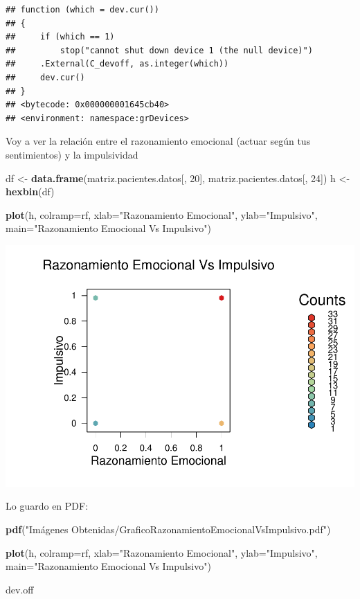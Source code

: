 \documentclass[]{article}
\newenvironment{Shaded}{\begin{snugshade}}{\end{snugshade}}
\newcommand{\DataTypeTok}[1]{\textcolor[rgb]{0.13,0.29,0.53}{#1}}
\newcommand{\DecValTok}[1]{\textcolor[rgb]{0.00,0.00,0.81}{#1}}
\newcommand{\KeywordTok}[1]{\textcolor[rgb]{0.13,0.29,0.53}{\textbf{#1}}}
\newcommand{\NormalTok}[1]{#1}
\newcommand{\StringTok}[1]{\textcolor[rgb]{0.31,0.60,0.02}{#1}}
\begin{document}
\begin{verbatim}
## function (which = dev.cur()) 
## {
##     if (which == 1) 
##         stop("cannot shut down device 1 (the null device)")
##     .External(C_devoff, as.integer(which))
##     dev.cur()
## }
## <bytecode: 0x000000001645cb40>
## <environment: namespace:grDevices>
\end{verbatim}

Voy a ver la relación entre el razonamiento emocional (actuar según tus
sentimientos) y la impulsividad

\begin{Shaded}
\begin{Highlighting}[]
\NormalTok{df <-}\StringTok{ }\KeywordTok{data.frame}\NormalTok{(matriz.pacientes.datos[, }\DecValTok{20}\NormalTok{], matriz.pacientes.datos[, }\DecValTok{24}\NormalTok{])}
\NormalTok{h <-}\StringTok{ }\KeywordTok{hexbin}\NormalTok{(df)}

\KeywordTok{plot}\NormalTok{(h, }\DataTypeTok{colramp=}\NormalTok{rf, }\DataTypeTok{xlab=}\StringTok{"Razonamiento Emocional"}\NormalTok{, }\DataTypeTok{ylab=}\StringTok{"Impulsivo"}\NormalTok{, }\DataTypeTok{main=}\StringTok{"Razonamiento Emocional Vs Impulsivo"}\NormalTok{)}
\end{Highlighting}
\end{Shaded}

\includegraphics{codigo_files/figure-latex/grafico_razEm_Impulsivo-1.pdf}

Lo guardo en PDF:

\begin{Shaded}
\begin{Highlighting}[]
\KeywordTok{pdf}\NormalTok{(}\StringTok{"Imágenes Obtenidas/GraficoRazonamientoEmocionalVsImpulsivo.pdf"}\NormalTok{)}

\KeywordTok{plot}\NormalTok{(h, }\DataTypeTok{colramp=}\NormalTok{rf, }\DataTypeTok{xlab=}\StringTok{"Razonamiento Emocional"}\NormalTok{, }\DataTypeTok{ylab=}\StringTok{"Impulsivo"}\NormalTok{, }\DataTypeTok{main=}\StringTok{"Razonamiento Emocional Vs Impulsivo"}\NormalTok{)}

\NormalTok{dev.off}
\end{Highlighting}
\end{Shaded}
\end{document}
